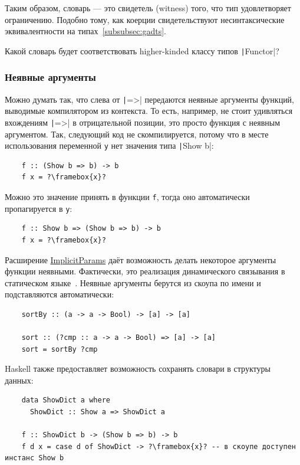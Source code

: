 Таким образом, словарь --- это свидетель (witness) того, что тип удовлетворяет ограничению.
Подобно тому, как коерции свидетельствуют несинтаксические эквивалентности на типах~\ref{subsubsec:gadts}.

\begin{task}
    Какой словарь будет соответствовать higher-kinded классу типов \texttt|Functor|?
\end{task}

\subsubsection{Неявные аргументы}

Можно думать так, что слева от \texttt|=>| передаются неявные аргументы функций, выводимые компилятором из контекста.
То есть, например, не стоит удивляться вхождениям \texttt|=>| в отрицательной позиции, это просто функция с неявным аргументом.
Так, следующий код не скомпилируется, потому что в месте использования переменной \texttt{y} нет значения типа \texttt|Show b|:
\begin{verbatim}
    f :: (Show b => b) -> b
    f x = ?\framebox{x}?
\end{verbatim}
Можно это значение принять в функции \texttt{f}, тогда оно автоматически пропагируется в \texttt{y}:
\begin{verbatim}
    f :: Show b => (Show b => b) -> b
    f x = ?\framebox{x}?
\end{verbatim}

Расширение \href{https://ghc.gitlab.haskell.org/ghc/doc/users_guide/exts/implicit_parameters.html}{ImplicitParams} даёт возможность делать некоторое аргументы функции неявными.
Фактически, это реализация динамического связывания в статическом языке~\cite{lewis2000implicit}.
Неявные аргументы берутся из скоупа по имени и подставляются автоматически:
\begin{verbatim}
    sortBy :: (a -> a -> Bool) -> [a] -> [a]

    sort :: (?cmp :: a -> a -> Bool) => [a] -> [a]
    sort = sortBy ?cmp
\end{verbatim}

Haskell также предоставляет возможность сохранять словари в структуры данных:
\begin{verbatim}
    data ShowDict a where
      ShowDict :: Show a => ShowDict a

    f :: ShowDict b -> (Show b => b) -> b
    f d x = case d of ShowDict -> ?\framebox{x}? -- в скоупе доступен инстанс Show b
\end{verbatim}

